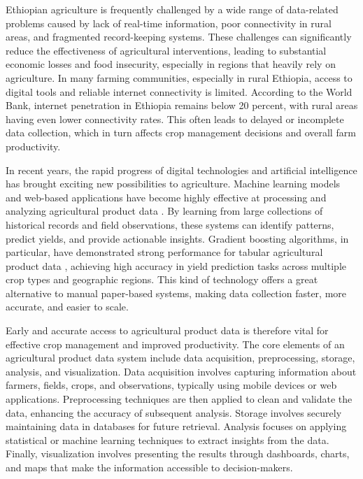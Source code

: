Ethiopian agriculture is frequently challenged by a wide range of data-related problems caused by lack of real-time information, poor connectivity in rural areas, and fragmented record-keeping systems. These challenges can significantly reduce the effectiveness of agricultural interventions, leading to substantial economic losses and food insecurity, especially in regions that heavily rely on agriculture. In many farming communities, especially in rural Ethiopia, access to digital tools and reliable internet connectivity is limited. According to the World Bank, internet penetration in Ethiopia remains below 20 percent, with rural areas having even lower connectivity rates. This often leads to delayed or incomplete data collection, which in turn affects crop management decisions and overall farm productivity.

In recent years, the rapid progress of digital technologies and artificial intelligence has brought exciting new possibilities to agriculture. Machine learning models and web-based applications have become highly effective at processing and analyzing agricultural product data . By learning from large collections of historical records and field observations, these systems can identify patterns, predict yields, and provide actionable insights. Gradient boosting algorithms, in particular, have demonstrated strong performance for tabular agricultural product data , achieving high accuracy in yield prediction tasks across multiple crop types and geographic regions. This kind of technology offers a great alternative to manual paper-based systems, making data collection faster, more accurate, and easier to scale.

Early and accurate access to agricultural product data is therefore vital for effective crop management and improved productivity. The core elements of an agricultural product data system include data acquisition, preprocessing, storage, analysis, and visualization. Data acquisition involves capturing information about farmers, fields, crops, and observations, typically using mobile devices or web applications. Preprocessing techniques are then applied to clean and validate the data, enhancing the accuracy of subsequent analysis. Storage involves securely maintaining data in databases for future retrieval. Analysis focuses on applying statistical or machine learning techniques to extract insights from the data. Finally, visualization involves presenting the results through dashboards, charts, and maps that make the information accessible to decision-makers.

